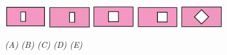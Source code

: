 \begin{figure}[H]
	\centering
	\captionsetup{labelformat=empty}
	\vspace*{-5pt}
	\captionsetup{justification=centering}
	\includegraphics[width =0.16\textwidth]{cat-2a}\quad
	\includegraphics[width =0.16\textwidth]{cat-2b}\quad
	\includegraphics[width =0.16\textwidth]{cat-2c}\quad
	\includegraphics[width =0.16\textwidth]{cat-2d}\quad
	\includegraphics[width =0.16\textwidth]{cat-2e}
	\caption{\small\textit{(A) \hspace*{45pt} (B) \hspace*{45pt} (C) \hspace*{45pt} (D) \hspace*{45pt} (E)}}
	\vspace*{-5pt}
\end{figure}

